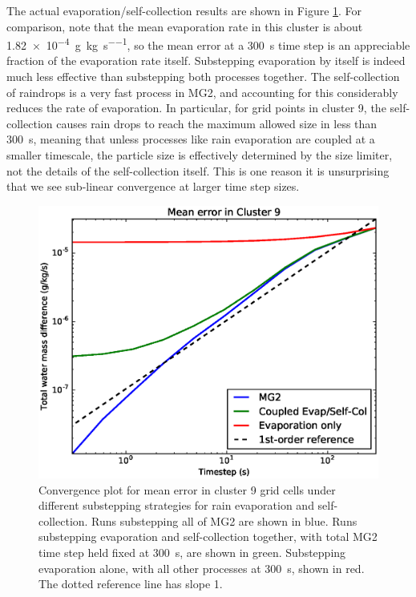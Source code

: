 \documentclass [11pt, proquest] {uwthesis}[2020/02/24]
\begin{document}
The actual evaporation/self-collection results are shown in Figure \ref{convergence-evap-scol}. For comparison, note that the mean evaporation rate in this cluster is about \SI{1.82e-4}{\gram\per\kilo\gram\per\second}, so the mean error at a \SI{300}{\second} time step is an appreciable fraction of the evaporation rate itself. Substepping evaporation by itself is indeed much less effective than substepping both processes together. The self-collection of raindrops is a very fast process in MG2, and accounting for this considerably reduces the rate of evaporation. In particular, for grid points in cluster 9, the self-collection causes rain drops to reach the maximum allowed size in less than \SI{300}{\second}, meaning that unless processes like rain evaporation are coupled at a smaller timescale, the particle size is effectively determined by the size limiter, not the details of the self-collection itself. This is one reason it is unsurprising that we see sub-linear convergence at larger time step sizes.

\begin{figure}[ht]
  \includegraphics[width=6.5in]{./substep_convergence_mean_c9.eps}
  \caption{Convergence plot for mean error in cluster 9 grid cells under different substepping strategies for rain evaporation and self-collection. Runs substepping all of MG2 are shown in blue. Runs substepping evaporation and self-collection together, with total MG2 time step held fixed at \SI{300}{\second}, are shown in green. Substepping evaporation alone, with all other processes at \SI{300}{\second}, shown in red. The dotted reference line has slope \num{1}.}
  \label{convergence-evap-scol}
\end{figure}
\end{document}
